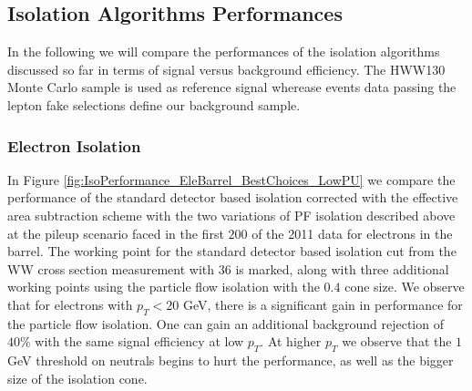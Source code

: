 \subsection{Isolation Algorithms Performances}


In the following we will compare the performances of the isolation algorithms discussed so far
in terms of signal versus background efficiency. The HWW130 Monte Carlo sample is used as reference signal
wherease events data passing the lepton fake selections define our background sample.

\subsubsection{Electron Isolation}

In Figure \ref{fig:IsoPerformance_EleBarrel_BestChoices_LowPU} we compare the performance of the 
standard detector based isolation corrected with the effective area subtraction scheme with the 
two variations of PF isolation described above at the pileup 
scenario faced in the first $200$ \ipb of the 2011 data for electrons in the barrel. The working 
point for the standard detector based isolation cut from the WW  cross section measurement with 
$36$ \ipb is marked, along with three additional working points using the particle flow isolation 
with the $0.4$ cone size. We observe that for electrons with $p_{T} < 20$ GeV, there is a 
significant gain in performance for the particle flow isolation. One can gain an additional 
background rejection of $40\%$ with the same signal efficiency at low $p_{T}$. At higher $p_{T}$ 
we observe that the $1$GeV threshold on neutrals begins to hurt the performance, as well as the 
bigger size of the isolation cone. 


